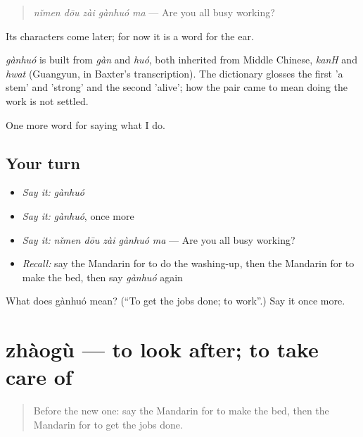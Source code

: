 \begin{quote}
\emph{nǐmen dōu zài gànhuó ma} — Are you all busy working?
\end{quote}

Its characters come later; for now it is a word for the ear.

\begin{cousinweb}
\emph{gànhuó} is built from \emph{gàn} and \emph{huó}, both inherited from Middle Chinese, \emph{kanH} and \emph{hwat} (Guangyun, in Baxter's transcription). The dictionary glosses the first 'a stem' and 'strong' and the second 'alive'; how the pair came to mean doing the work is not settled.
\end{cousinweb}

\begin{grammarlens}[title={What you've built}]
One more word for saying what I do.
\end{grammarlens}

\subsection*{Your turn}
\begin{itemize}
\raggedright
  \item \emph{Say it:} \emph{gànhuó}
  \item \emph{Say it:} \emph{gànhuó}, once more
  \item \emph{Say it:} \emph{nǐmen dōu zài gànhuó ma} — Are you all busy working?
  \item \emph{Recall:} say the Mandarin for to do the washing-up, then the Mandarin for to make the bed, then say \emph{gànhuó} again
\end{itemize}

\begin{tcolorbox}[breakable,colback=teal!4,colframe=teal!35!black,title={Before you move on}]
What does gànhuó mean? (\textquotedblleft{}To get the jobs done; to work\textquotedblright{}.) Say it once more.
\end{tcolorbox}
\section[zhàogù]{zhàogù — to look after; to take care of}

\label{lesson:ZH-C160-zhaogu}



\begin{quote}
Before the new one: say the Mandarin for to make the bed, then the Mandarin for to get the jobs done.
\end{quote}

